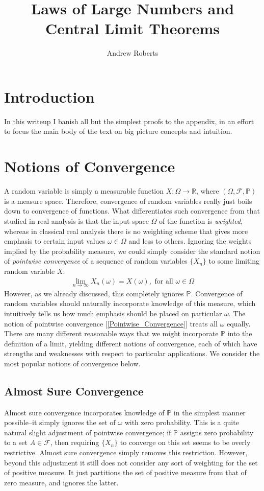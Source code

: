 \documentclass[12pt]{article}
\title{Laws of Large Numbers and Central Limit Theorems}
\author{Andrew Roberts}
\newcommand{\R}{\mathbb{R}}
\begin{document}
\maketitle
\tableofcontents
\newpage


\section{Introduction}
In this writeup I banish all but the simplest proofs to the appendix, in an effort to focus the main body of the text on big picture concepts and intuition. 

\section{Notions of Convergence}
A random variable is simply a measurable function $X: \Omega \to \R$, where $(\Omega, \mathcal{F}, \mathbb{P})$ is a measure space. Therefore, convergence of random variables
really just boils down to convergence of functions. What differentiates such convergence from that studied in real analysis is that the input space $\Omega$ of the function is \textit{weighted}, 
whereas in classical real analysis there is no weighting scheme that gives more emphasis to certain input values $\omega \in \Omega$ and less to others. Ignoring the weights implied by the 
probability measure, we could simply consider the standard notion of \textit{pointwise convergence} of a sequence of random variables $\{X_n\}$ to some limiting random variable $X$:
\begin{align}
\lim_{n \to \infty} X_n(\omega) = X(\omega), \text{ for all } \omega \in \Omega \label{Pointwise_Convergence}
\end{align}
However, as we already discussed, this completely ignores $\mathbb{P}$. Convergence of random variables should naturally incorporate knowledge of this measure, which intuitively tells us 
how much emphasis should be placed on particular $\omega$. The notion of pointwise convergence [\ref{Pointwise_Convergence}] treats all $\omega$ equally. There are many different reasonable
ways that we might incorporate $\mathbb{P}$ into the definition of a limit, yielding different notions of convergence, each of which have strengths and weaknesses with respect to particular applications. 
We consider the most popular notions of convergence below. 

\subsection{Almost Sure Convergence}
Almost sure convergence incorporates knowledge of $\mathbb{P}$ in the simplest manner possible--it simply ignores the set of $\omega$ with zero probability. This is a quite natural slight adjustment 
of pointwise convergence; if $\mathbb{P}$ assigns zero probability to a set $A \in \mathcal{F}$, then requiring $\{X_n\}$ to converge on this set seems to be overly restrictive. Almost sure convergence 
simply removes this restriction. However, beyond this adjustment it still does not consider any sort of weighting for the set of positive measure. It just partitions the set of positive measure from that of zero 
measure, and ignores the latter. 
\end{document}
